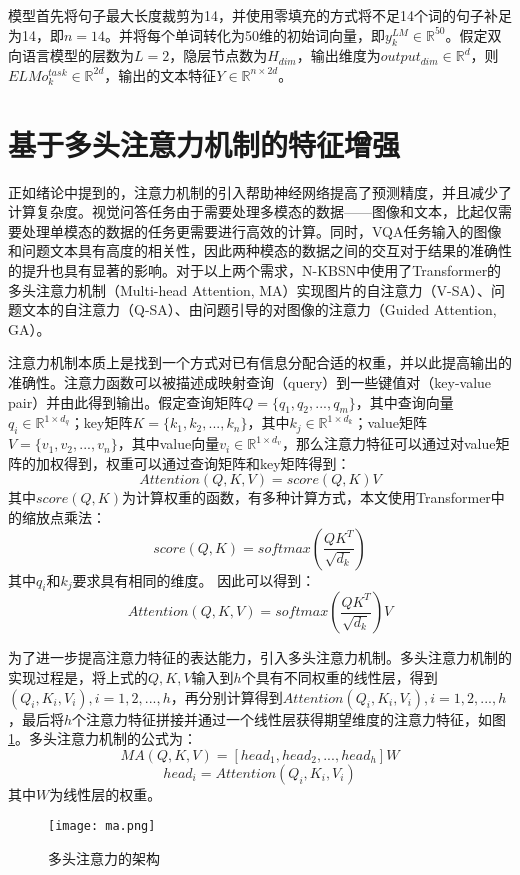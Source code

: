 模型首先将句子最大长度裁剪为14，并使用零填充的方式将不足14个词的句子补足为14，即$n=14$。并将每个单词转化为50维的初始词向量，即$y_k^{LM}\in \mathbb{R}^{50}$。假定双向语言模型的层数为$L = 2$，隐层节点数为$H_{dim}$，输出维度为$output_{dim} \in \mathbb{R}^d$，则$ELMo_k^{task} \in \mathbb{R}^{2d}$，输出的文本特征$Y \in \mathbb{R}^{n\times 2d}$。

\section{基于多头注意力机制的特征增强}
正如绪论中提到的，注意力机制的引入帮助神经网络提高了预测精度，并且减少了计算复杂度。视觉问答任务由于需要处理多模态的数据——图像和文本，比起仅需要处理单模态的数据的任务更需要进行高效的计算。同时，VQA任务输入的图像和问题文本具有高度的相关性，因此两种模态的数据之间的交互对于结果的准确性的提升也具有显著的影响。对于以上两个需求，N-KBSN中使用了Transformer的多头注意力机制（Multi-head Attention, MA）实现图片的自注意力（V-SA）、问题文本的自注意力（Q-SA）、由问题引导的对图像的注意力（Guided Attention, GA）。

注意力机制本质上是找到一个方式对已有信息分配合适的权重，并以此提高输出的准确性。注意力函数可以被描述成映射查询（query）到一些键值对（key-value pair）并由此得到输出。假定查询矩阵$Q = \{q_1, q_2, ..., q_m\}$，其中查询向量$q_i \in \mathbb{R}^{1 \times d_q}$；key矩阵$K = \{k_1, k_2, ..., k_n\}$，其中$k_j\in \mathbb{R}^{1 \times d_k}$；value矩阵$V = \{v_1, v_2, ..., v_n\}$，其中value向量$v_i \in \mathbb{R}^{1 \times d_v}$，那么注意力特征可以通过对value矩阵的加权得到，权重可以通过查询矩阵和key矩阵得到：
\begin{equation}
Attention(Q, K, V) = score(Q, K)V
\end{equation}
其中$score(Q, K)$为计算权重的函数，有多种计算方式，本文使用Transformer中的缩放点乘法：
\begin{equation}
score(Q, K) = softmax(\frac{QK^T}{\sqrt{d_k}})
\end{equation}
其中$q_i$和$k_j$要求具有相同的维度。
因此可以得到：
\begin{equation}
Attention(Q, K, V) = softmax(\frac{QK^T}{\sqrt{d_k}})V
\end{equation}

为了进一步提高注意力特征的表达能力，引入多头注意力机制。多头注意力机制的实现过程是，将上式的$Q, K, V$输入到$h$个具有不同权重的线性层，得到$(Q_i, K_i, V_i), i = 1, 2, ..., h$，再分别计算得到$Attention(Q_i, K_i, V_i), i = 1, 2, ..., h$，最后将$h$个注意力特征拼接并通过一个线性层获得期望维度的注意力特征，如图\ref{ma}。多头注意力机制的公式为：
\begin{equation}
MA(Q, K, V) = [head_1, head_2, ..., head_h]W
\end{equation}
\begin{equation}
head_i = Attention(Q_i, K_i, V_i)
\end{equation}
其中$W$为线性层的权重。
\begin{figure}[H]
	\texttt{[image: ma.png]}
	\caption{多头注意力的架构}
	\label{ma}
\end{figure}

